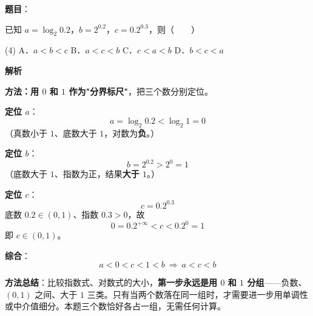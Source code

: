 \begin{answer}

\textbf{题目}：

已知 $a=\log_2 0.2$，$b=2^{0.2}$，$c=0.2^{0.3}$，则\mbox{（　　）}

\begin{gkopts}(4)
\task A．$a<b<c$
\task B．$a<c<b$
\task C．$c<a<b$
\task D．$b<c<a$
\end{gkopts}

\textbf{解析}

\textbf{方法：用 $0$ 和 $1$ 作为"分界标尺"}，把三个数分别定位。

\textbf{定位 $a$}：
\nopagebreak[4]
\[a=\log_2 0.2<\log_2 1=0\]
（真数小于 $1$、底数大于 $1$，对数为\textbf{负}。）

\textbf{定位 $b$}：
\nopagebreak[4]
\[b=2^{0.2}>2^{0}=1\]
（底数大于 $1$、指数为正，结果\textbf{大于 $1$}。）

\textbf{定位 $c$}：
\nopagebreak[4]
\[c=0.2^{0.3}\]
底数 $0.2\in(0,1)$、指数 $0.3>0$，故
\nopagebreak[4]
\[0=0.2^{+\infty}<c<0.2^{0}=1\]
即 $c\in(0,1)$。

\textbf{综合}：
\nopagebreak[4]
\[a<0<c<1<b\ \Longrightarrow\ a<c<b\]

\begin{gktip}
\textbf{方法总结}：比较指数式、对数式的大小，\textbf{第一步永远是用 $0$ 和 $1$ 分组}——负数、$(0,1)$ 之间、大于 $1$ 三类。只有当两个数落在同一组时，才需要进一步用单调性或中介值细分。本题三个数恰好各占一组，无需任何计算。
\end{gktip}


\par\medskip

\end{answer}

